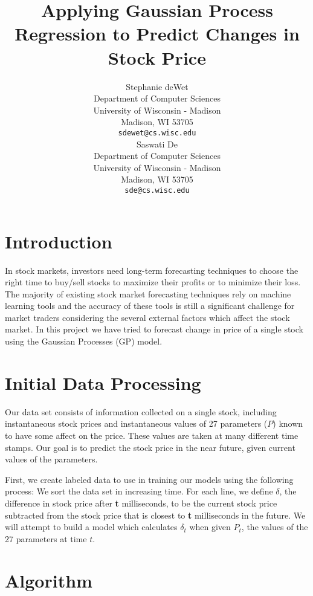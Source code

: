 \documentclass{article} %
\title{Applying Gaussian Process Regression to Predict Changes in Stock Price}
\author{
Stephanie deWet \\
Department of Computer Sciences\\
University of Wisconsin - Madison \\
Madison, WI 53705 \\
\texttt{sdewet@cs.wisc.edu} \\
\And
Saswati De \\
Department of Computer Sciences\\
University of Wisconsin - Madison \\
Madison, WI 53705 \\
\texttt{sde@cs.wisc.edu} \\
}
\begin{document}
\maketitle

\begin{abstract}
\end{abstract}

\section{Introduction}
In stock markets, investors need long-term forecasting techniques to choose the right time to buy/sell stocks to maximize their profits or to minimize their loss. The majority of existing stock market forecasting techniques rely on machine learning tools and the accuracy of these tools is still a significant challenge for market traders considering the several external factors which affect the stock market. In this project we have tried to forecast change in price of a single stock using the Gaussian Processes (GP) model.

\section{Initial Data Processing}
Our data set consists of information collected on a single stock, including instantaneous stock prices and instantaneous values of 27 parameters ($P$) known to have some affect on the price.
These values are taken at many different time stamps.
Our goal is to predict the stock price in the near future, given current values of the parameters.

First, we create labeled data to use in training our models using the following process:
We sort the data set in increasing time.
For each line, we define $\delta$, the difference in stock price after \textbf{t} milliseconds, to be the current stock price subtracted from the stock price that is closest to \textbf{t} milliseconds in the future.
We will attempt to build a model which calculates $\delta_t$ when given $P_t$, the values of the 27 parameters at time $t$.




\section{Algorithm}
\end{document}
